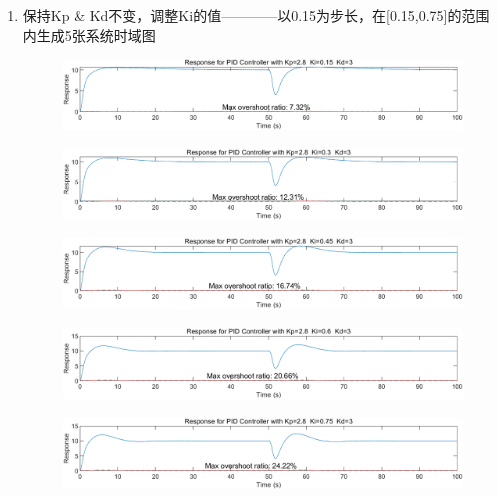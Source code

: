 \documentclass{thuemp}
\begin{document}
\begin{enumerate}
  \item 保持Kp \& Kd不变，调整Ki的值————以0.15为步长，在[0.15,0.75]的范围内生成5张系统时域图
  \begin{figure}[H]
    \centering
    \includegraphics[width=1\linewidth]{./img/PID_with_noise/pd1.png}
  \end{figure}
  \begin{figure}[H]
    \centering
    \includegraphics[width=1\linewidth]{./img/PID_with_noise/pd2.png}
  \end{figure}
  \begin{figure}[H]
    \centering
    \includegraphics[width=1\linewidth]{./img/PID_with_noise/pd3.png}
  \end{figure}
  \begin{figure}[H]
    \centering
    \includegraphics[width=1\linewidth]{./img/PID_with_noise/pd4.png}
  \end{figure}
  \begin{figure}[H]
    \centering
    \includegraphics[width=1\linewidth]{./img/PID_with_noise/pd5.png}
  \end{figure}


\end{enumerate}
\end{document}
